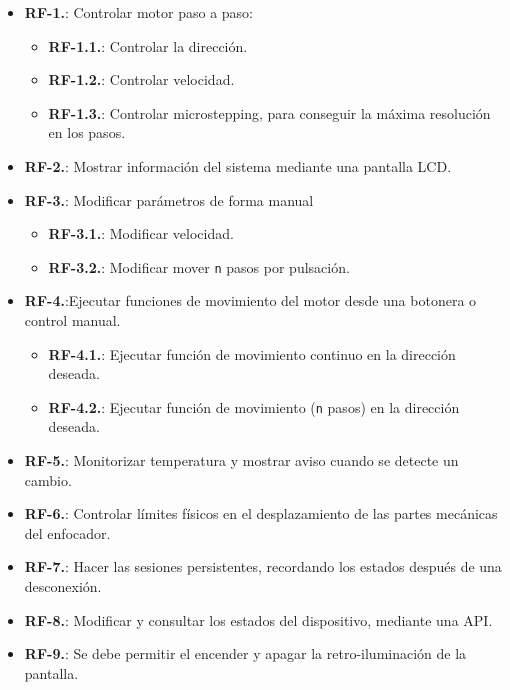 \begin{itemize}
	
	\item \textbf{RF-1.}: Controlar motor paso a paso:
	\begin{itemize}
		\item \textbf{RF-1.1.}: Controlar la dirección.
		\item \textbf{RF-1.2.}: Controlar velocidad.
		\item \textbf{RF-1.3.}: Controlar microstepping, para conseguir la máxima resolución en los pasos. \cite{micros}
		
	\end{itemize} 	
	\item \textbf{RF-2.}: Mostrar información del sistema mediante una pantalla LCD.
	
	\item \textbf{RF-3.}: Modificar parámetros de forma manual
	\begin{itemize}
		\item \textbf{RF-3.1.}: Modificar velocidad.
		\item \textbf{RF-3.2.}: Modificar mover \texttt{n} pasos por pulsación.
	\end{itemize}	
	\item \textbf{RF-4.}:Ejecutar funciones de movimiento del motor desde una botonera o control manual.
	\begin{itemize}
		\item \textbf{RF-4.1.}: Ejecutar función de movimiento continuo en la dirección deseada.
		\item \textbf{RF-4.2.}: Ejecutar función de movimiento (\texttt{n} pasos) en la dirección deseada. 
	\end{itemize}
	
	\item \textbf{RF-5.}: Monitorizar temperatura y mostrar aviso cuando se detecte un cambio.
	
	\item \textbf{RF-6.}: Controlar límites físicos en el desplazamiento de las partes mecánicas del enfocador.  
	
	\item \textbf{RF-7.}: Hacer las sesiones persistentes, recordando los estados después de una desconexión. 
	
	\item \textbf{RF-8.}: Modificar y consultar los estados del dispositivo, mediante una API.
	
	\item \textbf{RF-9.}: Se debe permitir el encender y apagar la retro-iluminación de la pantalla.
\end{itemize}

